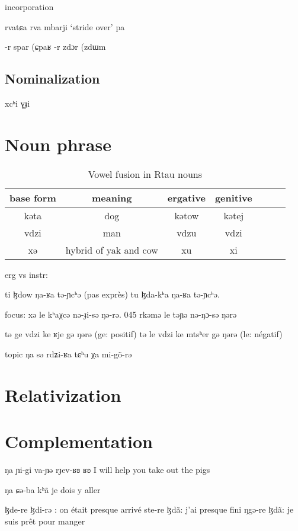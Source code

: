 \documentclass[oneside,a4paper,11pt]{article}
\newcommand{\ipa}[1]{{\phon #1}} %
\begin{document}
 
incorporation

\ipa{rvatɕa} \ipa{rva}
\ipa{mbarji} `stride over' \ipa{pa}

\ipa{-r} \ipa{spar} (\ipa{ɕpaʁ}
\ipa{-r} \ipa{zdɔr} (\ipa{zdɯm}

\subsection{Nominalization}

\ipa{xcʰi} \ipa{ɣɟi}

 \section{Noun phrase}
\begin{table}[H]
\caption{Vowel fusion in Rtau nouns} \label{tab:alternation.noun} \centering
\begin{tabular}{c|cccccc}
\toprule
base form & meaning & ergative & genitive \\
\midrule
\ipa{kəta} & dog & \ipa{kətow} & \ipa{kətej} & \\
\ipa{vdzi} & man & \ipa{vdzu} & \ipa{vdzi} & \\
\ipa{xə} & hybrid of yak and cow & \ipa{xu} & \ipa{xi} & \\
\bottomrule
\end{tabular}
\end{table}

erg vs instr:


	ti ɮdow ŋa-ʁa tə-ɲcʰə (pas exprès)
	tu ɮda-kʰa ŋa-ʁa tə-ɲcʰə.

focus:
xə le kʰaχcə nə-ɟi-sə ŋə-rə.
045	rkəmə le təɲə nə-ŋɔ-sə ŋərə

		tə ge vdzi ke ʁje gə ŋərə (ge: positif)
		tə le vdzi ke mtsʰer gə ŋərə (le: négatif)


topic
ŋa sə rdʑi-ʁa tɕʰu χa mi-gõ-rə 

\section{Relativization}

\section{Complementation}  

  ŋa ɲi-gi va-ɲə rɟev-ʁʚ ʁʚ
  I will help you take out the pigs


 ŋa ɕə-ba kʰã
 je dois y aller
 
 		ɮde-re ɮdi-rə : on était presque arrivé 
		ste-re ɮdã: j'ai presque fini
		ŋgə-re ɮdã: je suis prêt pour manger
		
\end{document}

